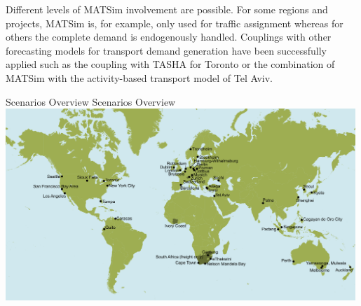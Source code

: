 Different levels of MATSim involvement are possible. For some regions and projects, MATSim is, for example, only used for traffic assignment whereas for others the complete demand is endogenously handled. Couplings with other forecasting models for transport demand generation have been successfully applied such as the coupling with TASHA for Toronto or the combination of MATSim with the activity-based transport model of Tel Aviv.

\createfigure%
{Scenarios Overview}%
{Scenarios Overview}%
{\label{fig:scenarios}}%
{\includegraphics[width=0.99\textwidth, angle=0]{using/figures/MATSimModelsMap}}%
{}

\clearpage
 \clearpage

 \clearpage

 \clearpage

 \clearpage

 \clearpage

 \clearpage

